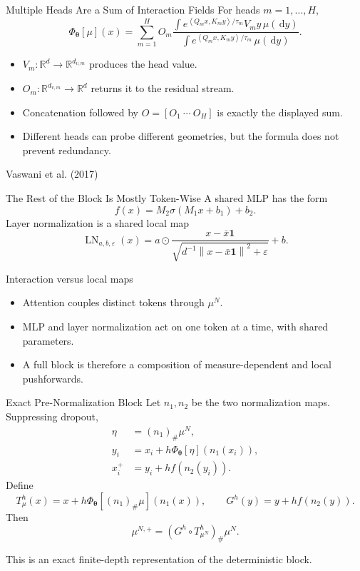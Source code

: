 \documentclass[aspectratio=169,11pt]{beamer}
\newcommand{\R}{\mathbb{R}}
\newcommand{\dd}{\,\mathrm{d}}
\newcommand{\norm}[1]{\left\lVert#1\right\rVert}
\newcommand{\ip}[2]{\left\langle#1,#2\right\rangle}
\newcommand{\onslidecite}[1]{\par\vspace{0.4ex}\hfill{\scriptsize\color{black!60}#1}}
\begin{document}
\begin{frame}{Multiple Heads Are a Sum of Interaction Fields}
For heads $m=1,\ldots,H$,
\[
 \Phi_{\boldsymbol\theta}[\mu](x)
 =\sum_{m=1}^H O_m
 \frac{\int e^{\ip{Q_mx}{K_my}/\tau_m}V_my\,\mu(\dd y)}
      {\int e^{\ip{Q_mx}{K_my}/\tau_m}\,\mu(\dd y)}.
\]

\begin{itemize}
\item $V_m:\R^d\to\R^{d_{v,m}}$ produces the head value.
\item $O_m:\R^{d_{v,m}}\to\R^d$ returns it to the residual stream.
\item Concatenation followed by $O=[O_1\ \cdots\ O_H]$ is exactly the displayed sum.
\item Different heads can probe different geometries, but the formula does not prevent redundancy.
\end{itemize}

\onslidecite{Vaswani et al. (2017)}
\end{frame}

\begin{frame}{The Rest of the Block Is Mostly Token-Wise}
A shared MLP has the form
\[
 f(x)=M_2\sigma(M_1x+b_1)+b_2.
\]
Layer normalization is a shared local map
\[
 \operatorname{LN}_{a,b,\varepsilon}(x)
 =a\odot\frac{x-\bar x\mathbf1}
 {\sqrt{d^{-1}\norm{x-\bar x\mathbf1}^2+\varepsilon}}+b.
\]

\begin{block}{Interaction versus local maps}
\begin{itemize}
\item Attention couples distinct tokens through $\mu^N$.
\item MLP and layer normalization act on one token at a time, with shared parameters.
\item A full block is therefore a composition of measure-dependent and local pushforwards.
\end{itemize}
\end{block}
\end{frame}

\begin{frame}{Exact Pre-Normalization Block}
Let $n_1,n_2$ be the two normalization maps.  Suppressing dropout,
\begin{align*}
 \eta&=(n_1)_\#\mu^N,\\
 y_i&=x_i+h\Phi_{\boldsymbol\theta}[\eta](n_1(x_i)),\\
 x_i^+&=y_i+h f(n_2(y_i)).
\end{align*}
Define
\[
 T_\mu^h(x)=x+h\Phi_{\boldsymbol\theta}[(n_1)_\#\mu](n_1(x)),
 \qquad
 G^h(y)=y+h f(n_2(y)).
\]
Then
\[
 \boxed{\mu^{N,+}=(G^h\circ T_{\mu^N}^h)_\#\mu^N.}
\]

This is an exact finite-depth representation of the deterministic block.
\end{frame}
\end{document}
